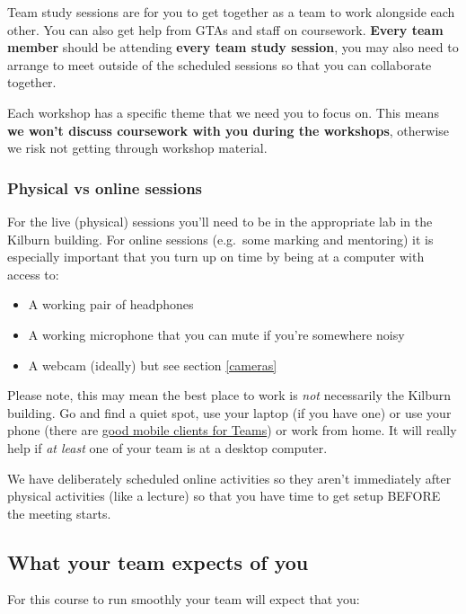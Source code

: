 \documentclass[
]{book}
\providecommand{\tightlist}{%
  \setlength{\itemsep}{0pt}\setlength{\parskip}{0pt}}
\begin{document}
Team study sessions are for you to get together as a team to work alongside each other. You can also get help from GTAs and staff on coursework. \textbf{Every team member} should be attending \textbf{every team study session}, you may also need to arrange to meet outside of the scheduled sessions so that you can collaborate together.

Each workshop has a specific theme that we need you to focus on. This means \textbf{we won't discuss coursework with you during the workshops}, otherwise we risk not getting through workshop material.

\hypertarget{online}{%
\subsubsection{Physical vs online sessions}\label{online}}

For the live (physical) sessions you'll need to be in the appropriate lab in the Kilburn building. For online sessions (e.g.~some marking and mentoring) it is especially important that you turn up on time by being at a computer with access to:

\begin{itemize}
\tightlist
\item
  A working pair of headphones
\item
  A working microphone that you can mute if you're somewhere noisy
\item
  A webcam (ideally) but see section \ref{cameras}
\end{itemize}

Please note, this may mean the best place to work is \emph{not} necessarily the Kilburn building. Go and find a quiet spot, use your laptop (if you have one) or use your phone (there are \href{https://www.microsoft.com/en-gb/microsoft-teams/download-app}{good mobile clients for Teams}) or work from home. It will really help if \emph{at least} one of your team is at a desktop computer.

We have deliberately scheduled online activities so they aren't immediately after physical activities (like a lecture) so that you have time to get setup BEFORE the meeting starts.

\hypertarget{urteam}{%
\subsection{What your team expects of you}\label{urteam}}

For this course to run smoothly your team will expect that you:
\end{document}
